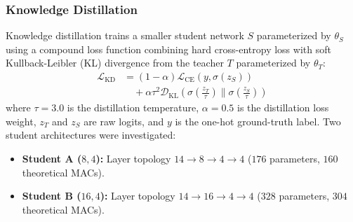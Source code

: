 \documentclass[journal,10pt]{IEEEtran}
\begin{document}
\subsubsection{Knowledge Distillation}
Knowledge distillation trains a smaller student network $S$ parameterized by $\theta_S$ using a compound loss function combining hard cross-entropy loss with soft Kullback-Leibler (KL) divergence from the teacher $T$ parameterized by $\theta_T$:
\begin{equation}
\begin{split}
    \mathcal{L}_{\text{KD}} &= (1 - \alpha)\mathcal{L}_{\text{CE}}(y, \sigma(z_S)) \\
    &\quad + \alpha \tau^2 \mathcal{D}_{\text{KL}}\left(\sigma\left(\frac{z_T}{\tau}\right) \parallel \sigma\left(\frac{z_S}{\tau}\right)\right)
\end{split}
\end{equation}
where $\tau = 3.0$ is the distillation temperature, $\alpha = 0.5$ is the distillation loss weight, $z_T$ and $z_S$ are raw logits, and $y$ is the one-hot ground-truth label. Two student architectures were investigated:
\begin{itemize}
    \item \textbf{Student A ($8, 4$):} Layer topology $14 \rightarrow 8 \rightarrow 4 \rightarrow 4$ ($176$ parameters, $160$ theoretical MACs).
    \item \textbf{Student B ($16, 4$):} Layer topology $14 \rightarrow 16 \rightarrow 4 \rightarrow 4$ ($328$ parameters, $304$ theoretical MACs).
\end{itemize}
\end{document}
